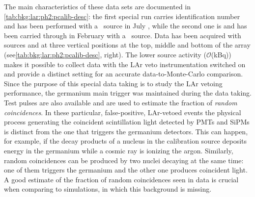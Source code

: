 The main characteristics of these data sets are documented in
\cref{tab:bkg:lar:ph2:pcalib-desc}: the first special run carries identification number
 and has been performed with a \Th\ source in July , while the second one
is  and has been carried through in February  with a \Ra\ source. Data has been
acquired with sources  and  at three vertical positions at the top, middle and
bottom of the array (see\cref{tab:bkg:lar:ph2:pcalib-desc}, right). The lower source
activity ($\mathcal{O}$(kBq)) makes it possible to collect data with the LAr veto
instrumentation switched on and provide a distinct setting for an accurate
data-to-Monte-Carlo comparison. Since the purpose of this special data taking is to study
the LAr vetoing performance, the germanium main trigger was maintained during the
data taking. Test pulses are also available and are used to estimate the fraction of
\emph{random coincidences}. In these particular, false-positive, LAr-vetoed events the
physical process generating the coincident scintillation light detected by PMTs and SiPMs
is distinct from the one that triggers the germanium detectors. This can happen, for
example, if the decay products of a nucleus in the calibration source deposits energy in
the germanium while a cosmic ray is ionizing the argon. Similarly, random coincidences can
be produced by two nuclei decaying at the same time: one of them triggers the germanium
and the other one produces coincident light. A good estimate of the fraction of random
coincidences seen in data is crucial when comparing to simulations, in which this
background is missing.

